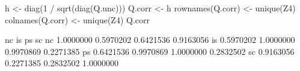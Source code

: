 \begin{Schunk}
\begin{Sinput}
 h <- diag(1 / sqrt(diag(Q.unc)))
 Q.corr <- h %*% Q.unc %*% h
 rownames(Q.corr) <- unique(Z4)
 colnames(Q.corr) <- unique(Z4)
 Q.corr
\end{Sinput}
\begin{Soutput}
          nc        is        ps        sc
nc 1.0000000 0.5970202 0.6421536 0.9163056
is 0.5970202 1.0000000 0.9970869 0.2271385
ps 0.6421536 0.9970869 1.0000000 0.2832502
sc 0.9163056 0.2271385 0.2832502 1.0000000
\end{Soutput}
\end{Schunk}

